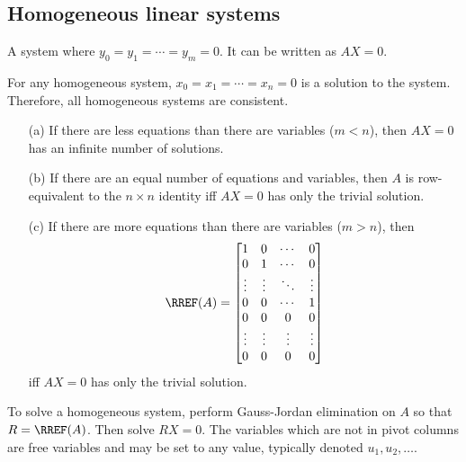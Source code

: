 \subsection{Homogeneous linear systems}

\begin{definition} A system where $y_0 = y_1 = \cdots = y_m = 0$. It can be written as $AX = 0$.
\end{definition}

\begin{theorem} For any homogeneous system, $x_0 = x_1 = \cdots = x_n = 0$ is a solution to the system. Therefore, all homogeneous systems are consistent.
\end{theorem}

\begin{theorem}
  \begin{enumerate}
    \item[(a)] If there are less equations than there are variables ($m < n$), then $AX = 0$ has an infinite number of solutions.
    \item[(b)] If there are an equal number of equations and variables, then $A$ is row-equivalent to the $n \times n$ identity iff $AX = 0$ has only the trivial solution.
    \item[(c)] If there are more equations than there are variables ($m > n$), then 
    \[
      \RREF(A) = \begin{bmatrix}
        1 & 0 & \cdots & 0 \\
        0 & 1 & \cdots & 0 \\
        \vdots & \vdots & \ddots & \vdots \\
        0 & 0 & \cdots & 1 \\
        0 & 0 & 0 & 0 \\
        \vdots & \vdots & \vdots & \vdots \\
        0 & 0 & 0 & 0 \\
      \end{bmatrix}
    \] iff $AX = 0$ has only the trivial solution.
  \end{enumerate}
\end{theorem}

\begin{procedure}[Solution] To solve a homogeneous system, perform Gauss-Jordan elimination on $A$ so that $R = \RREF(A)$. Then solve $RX = 0$. The variables which are not in pivot columns are free variables and may be set to any value, typically denoted $u_1, u_2, \ldots$.
\end{procedure}

